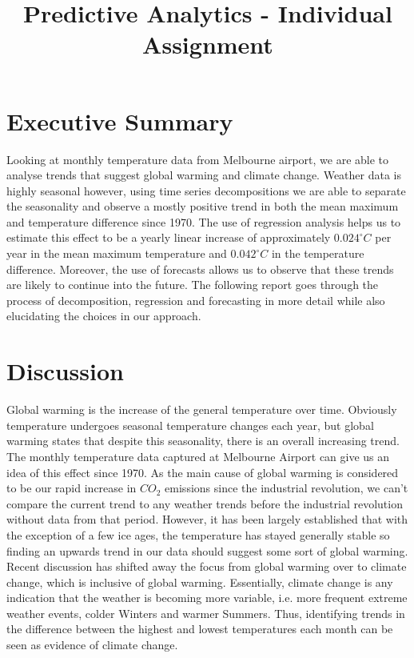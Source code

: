 \documentclass[12pt]{article}
\begin{document}
\title{Predictive Analytics - Individual Assignment}
\maketitle
{\setlength{\parindent}{0cm}
\section*{Executive Summary}
Looking at monthly temperature data from Melbourne airport, we are able to analyse trends that suggest global warming and climate change. Weather data is highly seasonal however, using time series decompositions we are able to separate the seasonality and observe a mostly positive trend in both the mean maximum and temperature difference since 1970. The use of regression analysis helps us to estimate this effect to be a yearly linear increase of approximately $0.024^\circ C$ per year in the mean maximum temperature and $0.042^\circ C$ in the temperature difference. Moreover, the use of forecasts allows us to observe that these trends are likely to continue into the future. The following report goes through the process of decomposition, regression and forecasting in more detail while also elucidating the choices in our approach.

\section*{Discussion}
Global warming is the increase of the general temperature over time. Obviously temperature undergoes seasonal temperature changes each year, but global warming states that despite this seasonality, there is an overall increasing trend. The monthly temperature data captured at Melbourne Airport can give us an idea of this effect since 1970. As the main cause of global warming is considered to be our rapid increase in $CO_2$ emissions since the industrial revolution, we can't compare the current trend to any weather trends before the industrial revolution without data from that period. However, it has been largely established that with the exception of a few ice ages, the temperature has stayed generally stable so finding an upwards trend in our data should suggest some sort of global warming.\\

Recent discussion has shifted away the focus from global warming over to climate change, which is inclusive of global warming. Essentially, climate change is any indication that the weather is becoming more variable, i.e. more frequent extreme weather events, colder Winters and warmer Summers. Thus, identifying trends in the difference between the highest and lowest temperatures each month can be seen as evidence of climate change.\\

}
\end{document}
